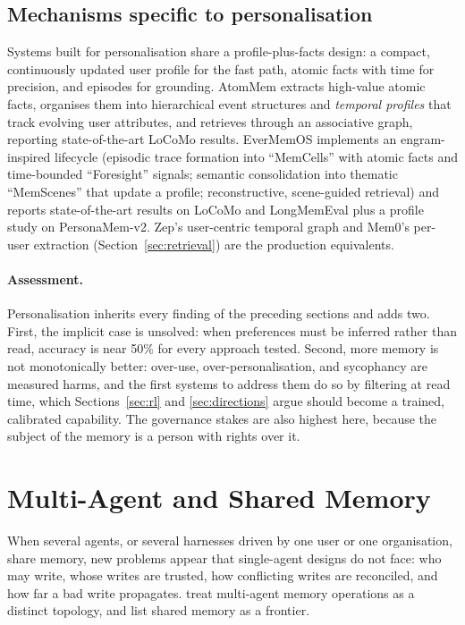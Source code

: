 \documentclass[11pt]{article}
\begin{document}
\subsection{Mechanisms specific to personalisation}

Systems built for personalisation share a profile-plus-facts design: a compact, continuously updated user profile for the fast path, atomic facts with time for precision, and episodes for grounding. AtomMem \citep{yao2026atommem} extracts high-value atomic facts, organises them into hierarchical event structures and \emph{temporal profiles} that track evolving user attributes, and retrieves through an associative graph, reporting state-of-the-art LoCoMo results. EverMemOS \citep{hu2026evermemos} implements an engram-inspired lifecycle (episodic trace formation into ``MemCells'' with atomic facts and time-bounded ``Foresight'' signals; semantic consolidation into thematic ``MemScenes'' that update a profile; reconstructive, scene-guided retrieval) and reports state-of-the-art results on LoCoMo and LongMemEval plus a profile study on PersonaMem-v2. Zep's user-centric temporal graph and Mem0's per-user extraction (Section~\ref{sec:retrieval}) are the production equivalents.

\paragraph{Assessment.} Personalisation inherits every finding of the preceding sections and adds two. First, the implicit case is unsolved: when preferences must be inferred rather than read, accuracy is near 50\% for every approach tested. Second, more memory is not monotonically better: over-use, over-personalisation, and sycophancy are measured harms, and the first systems to address them do so by filtering at read time, which Sections~\ref{sec:rl} and \ref{sec:directions} argue should become a trained, calibrated capability. The governance stakes are also highest here, because the subject of the memory is a person with rights over it.

\section{Multi-Agent and Shared Memory}
\label{sec:multiagent}

When several agents, or several harnesses driven by one user or one organisation, share memory, new problems appear that single-agent designs do not face: who may write, whose writes are trusted, how conflicting writes are reconciled, and how far a bad write propagates. \citet{huang2026secondhalf} treat multi-agent memory operations as a distinct topology, and \citet{hu2025memoryage} list shared memory as a frontier.
\end{document}
